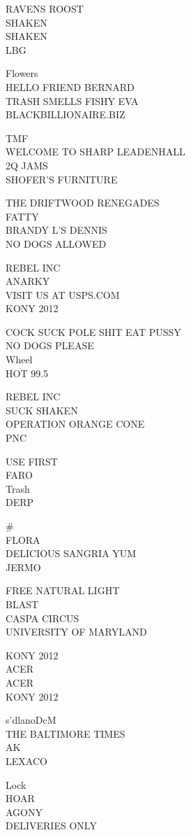 \documentclass[10pt,letterpaper]{article}
\begin{document}
RAVENS ROOST\\
SHAKEN\\
SHAKEN\\
LBG

Flowers\\
HELLO FRIEND BERNARD\\
TRASH SMELLS FISHY EVA\\
BLACKBILLIONAIRE.BIZ

TMF\\
WELCOME TO SHARP LEADENHALL\\
2Q JAMS\\
SHOFER'S FURNITURE

THE DRIFTWOOD RENEGADES\\
FATTY\\
BRANDY L'S DENNIS\\
NO DOGS ALLOWED

REBEL INC\\
ANARKY\\
VISIT US AT USPS.COM\\
KONY 2012

COCK SUCK POLE SHIT EAT PUSSY\\
NO DOGS PLEASE\\
Wheel\\
HOT 99.5

REBEL INC\\
SUCK SHAKEN\\
OPERATION ORANGE CONE\\
PNC

USE FIRST\\
FARO\\
Trash\\
DERP

\#\\
FLORA\\
DELICIOUS SANGRIA YUM\\
JERMO

FREE NATURAL LIGHT\\
BLAST\\
CASPA CIRCUS\\
UNIVERSITY OF MARYLAND

KONY 2012\\
ACER\\
ACER\\
KONY 2012

s'dlanoDcM\\
THE BALTIMORE TIMES\\
AK\\
LEXACO

Lock\\
HOAR\\
AGONY\\
DELIVERIES ONLY
\end{document}

